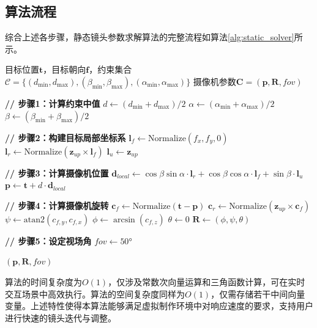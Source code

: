 \subsection{算法流程}

综合上述各步骤，静态镜头参数求解算法的完整流程如算法\ref{alg:static_solver}所示。

\begin{algorithm}[htbp]
    \caption{静态镜头参数求解算法}
    \label{alg:static_solver}
    \begin{algorithmic}[1]
    \REQUIRE 目标位置$\mathbf{t}$，目标朝向$\mathbf{f}$，约束集合$\mathcal{C} = \{(d_{\min}, d_{\max}), (\beta_{\min}, \beta_{\max}), (\alpha_{\min}, \alpha_{\max})\}$
    \ENSURE 摄像机参数$\mathbf{C} = (\mathbf{p}, \mathbf{R}, \textit{fov})$
    
    \STATE \textbf{// 步骤1：计算约束中值}
    \STATE $d \gets (d_{\min} + d_{\max}) / 2$
    \STATE $\alpha \gets (\alpha_{\min} + \alpha_{\max}) / 2$
    \STATE $\beta \gets (\beta_{\min} + \beta_{\max}) / 2$
    
    \STATE \textbf{// 步骤2：构建目标局部坐标系}
    \STATE $\mathbf{l}_f \gets \text{Normalize}(f_x, f_y, 0)$
    \STATE $\mathbf{l}_r \gets \text{Normalize}(\mathbf{z}_{up} \times \mathbf{l}_f)$
    \STATE $\mathbf{l}_u \gets \mathbf{z}_{up}$
    
    \STATE \textbf{// 步骤3：计算摄像机位置}
    \STATE $\mathbf{d}_{local} \gets \cos\beta \sin\alpha \cdot \mathbf{l}_r + \cos\beta \cos\alpha \cdot \mathbf{l}_f + \sin\beta \cdot \mathbf{l}_u$
    \STATE $\mathbf{p} \gets \mathbf{t} + d \cdot \mathbf{d}_{local}$
    
    \STATE \textbf{// 步骤4：计算摄像机旋转}
    \STATE $\mathbf{c}_f \gets \text{Normalize}(\mathbf{t} - \mathbf{p})$
    \STATE $\mathbf{c}_r \gets \text{Normalize}(\mathbf{z}_{up} \times \mathbf{c}_f)$
    \STATE $\psi \gets \text{atan2}(c_{f,y}, c_{f,x})$
    \STATE $\phi \gets \arcsin(c_{f,z})$
    \STATE $\theta \gets 0$
    \STATE $\mathbf{R} \gets (\phi, \psi, \theta)$
    
    \STATE \textbf{// 步骤5：设定视场角}
    \STATE $\textit{fov} \gets 50°$
    
    \RETURN $(\mathbf{p}, \mathbf{R}, \textit{fov})$
    \end{algorithmic}
\end{algorithm}

算法的时间复杂度为$O(1)$，仅涉及常数次向量运算和三角函数计算，可在实时交互场景中高效执行。算法的空间复杂度同样为$O(1)$，仅需存储若干中间向量变量。上述特性使得本算法能够满足虚拟制作环境中对响应速度的要求，支持用户进行快速的镜头迭代与调整。

